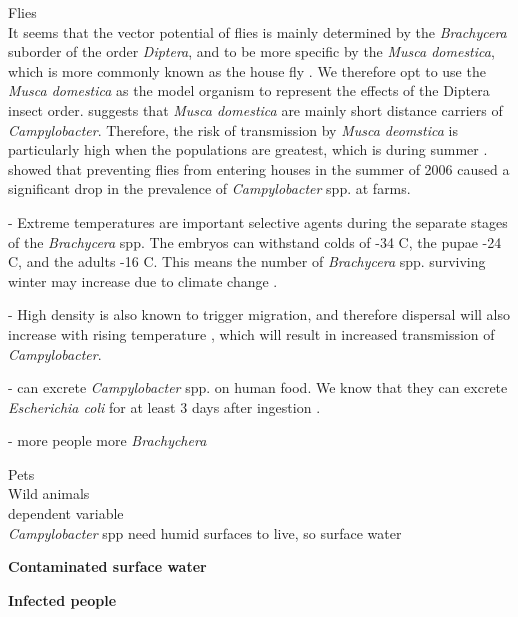 \textcolor{AMAZINGPINK}{Flies} \\
It seems that the vector potential of flies is mainly determined by the \textit{Brachycera} suborder of the order \textit{Diptera}, and to be more specific by the \textit{Musca domestica}, which is more commonly known as the house fly \parencite{hald_influxed_2008}. We therefore opt to use the \textit{Musca domestica} as the model organism to represent the effects of the Diptera insect order. \cite{skovgard_retention_2011} suggests that \textit{Musca domestica} are mainly short distance carriers of \textit{Campylobacter}. Therefore, the risk of transmission by \textit{Musca deomstica} is particularly high when the populations are greatest, which is during summer \parencite{royden_role_2016}. \cite{hald_use_2007} showed that preventing flies from entering houses in the summer of 2006 caused a significant drop in the prevalence of \textit{Campylobacter} spp. at farms.


- Extreme temperatures are important selective agents during the separate stages of the \textit{Brachycera} spp. The embryos can withstand colds of -34 \degree C, the pupae -24 \degree C, and the adults -16 \degree C.  This means the number of \textit{Brachycera} spp. surviving winter may increase due to climate change \parencite{goulson_predicting_2005}.

- High density is also known to trigger migration, and therefore dispersal will also increase with rising temperature \parencite{feder_locomotion_2010}, which will result in increased transmission of \textit{Campylobacter}.

-  can excrete \textit{Campylobacter} spp. on human food. We know that they can excrete \textit{Escherichia coli} for at least 3 days after ingestion \parencite{sasaki_epidemiological_2000}.

- more people \xrightarrow[]{} more \textit{Brachychera}

\textcolor{AMAZINGPINK}{Pets} \\

\textcolor{AMAZINGPINK}{Wild animals} \\

\textcolor{AMAZINGPINK}{dependent variable} \\
\textit{Campylobacter} spp need humid surfaces to live, so surface water %


\textbf{Contaminated surface water}

\textbf{Infected people}

